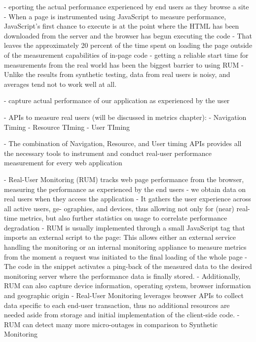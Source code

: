 - eporting the actual performance experienced by end users as they browse a site
- When a page is instrumented using JavaScript to measure performance, JavaScript’s first chance to execute is at the point where the HTML has been downloaded from the server and the browser has begun executing the code
- That leaves the approximately 20 percent of the time spent on loading the page outside of the measurement capabilities of in-page code
- getting a reliable start time for measurements from the real world has been the biggest barrier to using RUM
- Unlike the results from synthetic testing, data from real users is noisy, and averages tend not to work well at all.



- capture actual performance of our application as experienced by the user

- APIs to measure real users (will be discussed in metrics chapter):
- Navigation Timing
- Resource TIming
- User TIming

- The combination of Navigation, Resource, and User timing APIs provides all the necessary tools to instrument and conduct real-user performance measurement for every web application





- Real-User Monitoring (RUM) tracks web page performance from the browser, measuring the performance as experienced by the end users
- we obtain data on real users when they access the application
- It gathers the user experience across all active users, ge- ographies, and devices, thus allowing not only for (near) real-time metrics, but also further statistics on usage to correlate performance degradation
- RUM is usually implemented through a small JavaScript tag that imports an external script to the page: This allows either an external service handling the monitoring or an internal monitoring appliance to measure metrics from the moment a request was initiated to the final loading of the whole page
- The code in the snippet activates a ping-back of the measured data to the desired monitoring server where the performance data is finally stored.
- Additionally, RUM can also capture device information, operating system, browser information and geographic origin
- Real-User Monitoring leverages browser APIs to collect data specific to each end-user transaction, thus no additional resources are needed aside from storage and initial implementation of the client-side code.
- RUM can detect many more micro-outages in comparison to Synthetic Monitoring


